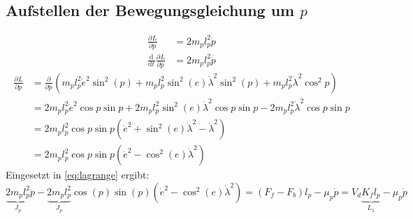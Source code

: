 \documentclass{article}
\newcommand{\partiell}[3][]{\frac{\partial^{#1}#2}{\partial{#3}^{#1}}}
\newcommand{\diff}[3][]{\frac{\mathrm{d}^{#1}#2}{\mathrm{d}{#3}^{#1}}}
\begin{document}
	\subsection{Aufstellen der Bewegungsgleichung um $p$}
	\begin{align}
	\partiell{L}{\dot{p}} &= 2m_p l_p^2 \dot{p}\\
	\diff{}{t} \partiell{L}{\dot{p}} &= 2m_p l_p^2 \ddot{p}
	\end{align}
	\begin{equation}
	\begin{split}
	\partiell{L}{p} &= \partiell{}{p} (m_p l_p^2 \dot{e}^2 \sin^2 (p) 
	+ m_p l_p^2 \sin^2 (e) \dot{\lambda}^2 \sin^2 (p)
	+ m_p l_p^2 \dot{\lambda}^2 \cos^2 p)\\
	&= 2 m_p l_p^2 \dot{e}^2 \cos p \sin p + 2 m_p l_p^2 \sin^2 (e) \dot{\lambda}^2 \cos p \sin p 
	- 2 m_p l_p^2 \dot{\lambda}^2 \cos p \sin p\\
	&= 2 m_p l_p^2 \cos p \sin p (\dot{e}^2+ \sin^2 (e) \dot{\lambda}^2- \dot{\lambda}^2)\\
	&= 2 m_p l_p^2 \cos p \sin p (\dot{e}^2- \cos^2 (e) \dot{\lambda}^2)
	\end{split}
	\end{equation}
	Eingesetzt in \eqref{eq:lagrange} ergibt:
	\begin{equation}
	\underbrace{2m_p l_p^2}_{J_p} \ddot{p} -  \underbrace{2 m_p l_p^2}_{J_p} \cos (p) \sin (p) (\dot{e}^2- \cos^2 (e) \dot{\lambda}^2) = (F_f - F_b)l_p - \mu_p \dot{p} = V_d \underbrace{K_f l_p}_{L_1} - \mu_p \dot{p}
	\end{equation}
\end{document}
